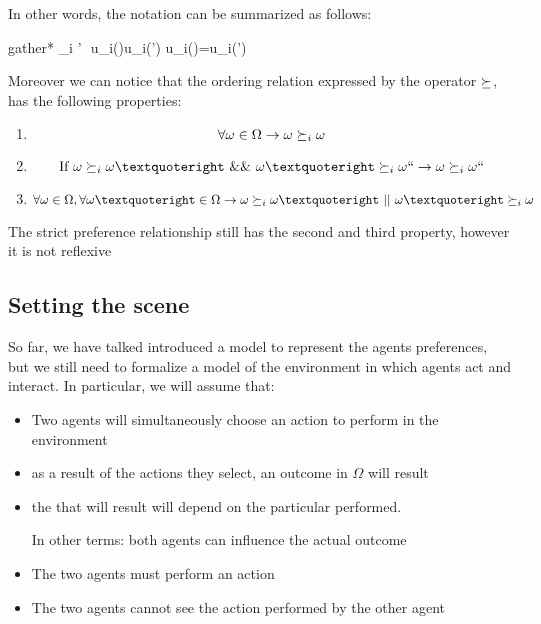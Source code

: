 	In other words, the notation can be summarized as follows:
	\begin{empheq}[box=%
	\fbox]{gather*}
		\omega \cmore_i \omega’ \,\iff\,u_i(\omega)\ge u_i(\omega’) u_i(\omega)=u_i(\omega’)
	\end{empheq}
	
	Moreover we can notice that the ordering relation expressed by the operator $\succeq$, has the following properties:
	\begin{enumerate}
	\item {}
	\[\forall \omega \in \Omega\rightarrow \omega\succeq_i\omega\]
	\item {}
	\[\text{If } \omega \cge_i\omega’ \text{ \&\& } \omega’\cge_i\omega`` \rightarrow \omega \cge_i\omega``\]
	\item {}
	\[\forall \omega\in \Omega, \forall \omega’\in\Omega\rightarrow \omega\cge_i\omega’\text{ || } \omega’\cge_i\omega\]
	\end{enumerate}
	The strict preference relationship still has the second and third property, however it is not reflexive
	
\subsection{Setting the scene}
So far, we have talked introduced a model to represent the agents preferences, but we still need to formalize a model of the environment in which agents act and interact. In particular, we will assume that:
	\begin{itemize}
	\item Two agents will simultaneously choose an action to perform in the environment
	\item as a result of the actions they select, an outcome in $\Omega$ will result
	\item the  that will result will depend on the particular  performed.
	
	In other terms: both agents can influence the actual outcome 
	\item The two agents must perform an action
	\item The two agents cannot see the action performed by the other agent
	\end{itemize}
	
